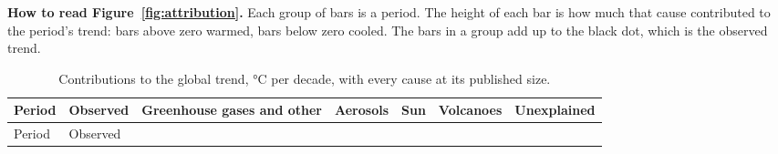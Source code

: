 \textbf{How to read Figure~\ref{fig:attribution}.} Each group of bars is a period. The height of each bar is how much that cause contributed to the period's trend: bars above zero warmed, bars below zero cooled. The bars in a group add up to the black dot, which is the observed trend.

\begin{longtable}[]{@{}
  >{\raggedright\arraybackslash}p{}
  >{\raggedright\arraybackslash}p{}
  >{\raggedright\arraybackslash}p{}
  >{\raggedright\arraybackslash}p{}
  >{\raggedright\arraybackslash}p{}
  >{\raggedright\arraybackslash}p{}
  >{\raggedright\arraybackslash}p{}@{}}
\caption{Contributions to the global trend, °C per decade, with every cause at its published size.}\label{tab:attribution}\tabularnewline
\toprule\noalign{}
\begin{minipage}[b]{\linewidth}\raggedright
Period
\end{minipage} & \begin{minipage}[b]{\linewidth}\raggedright
Observed
\end{minipage} & \begin{minipage}[b]{\linewidth}\raggedright
Greenhouse gases and other
\end{minipage} & \begin{minipage}[b]{\linewidth}\raggedright
Aerosols
\end{minipage} & \begin{minipage}[b]{\linewidth}\raggedright
Sun
\end{minipage} & \begin{minipage}[b]{\linewidth}\raggedright
Volcanoes
\end{minipage} & \begin{minipage}[b]{\linewidth}\raggedright
Unexplained
\end{minipage} \\
\midrule\noalign{}
\endfirsthead
\toprule\noalign{}
\begin{minipage}[b]{\linewidth}\raggedright
Period
\end{minipage} & \begin{minipage}[b]{\linewidth}\raggedright
Observed
\end{minipage} & \begin{minipage}[b]{\linewidth}\raggedright

\end{minipage}
\end{longtable}
